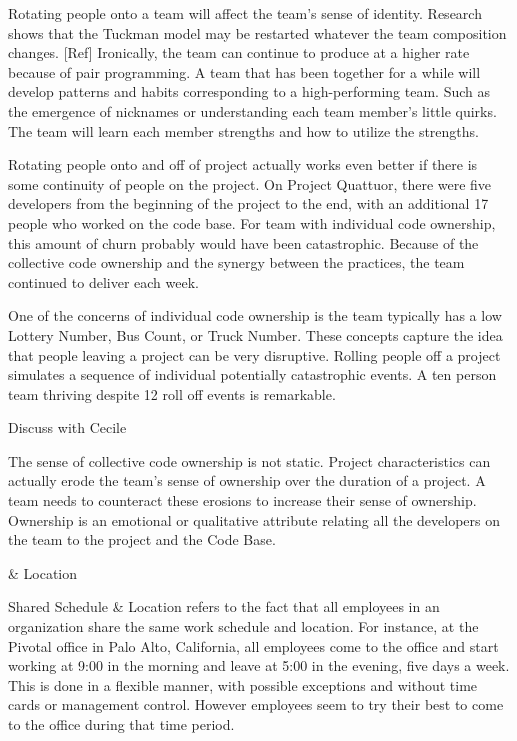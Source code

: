 \begin{table}[]
Rotating people onto a team will affect the team's sense of identity. Research shows that the Tuckman model may be restarted whatever the team composition changes. [Ref] Ironically, the team can continue to produce at a higher rate because of pair programming. A team that has been together for a while will develop patterns and habits corresponding to a high-performing team. Such as the emergence of nicknames or understanding each team member's little quirks. The team will learn each member strengths and how to utilize the strengths. 

Rotating people onto and off of project actually works even better if there is some continuity of people on the project. On Project Quattuor, there were five developers from the beginning of the project to the end, with an additional 17 people who worked on the code base. For team with individual code ownership, this amount of churn probably would have been catastrophic. Because of the collective code ownership and the synergy between the practices, the team continued to deliver each week.

One of the concerns of individual code ownership is the team typically has a low Lottery Number, Bus Count, or Truck Number. These concepts capture the idea that people leaving a project can be very disruptive. Rolling people off a project simulates a sequence of individual potentially catastrophic events. A ten person team thriving despite 12 roll off events is remarkable. 


Discuss with Cecile


The sense of collective code ownership is not static. Project characteristics can actually erode the team's sense of ownership over the duration of a project. A team needs to counteract these erosions to increase their sense of ownership. Ownership is an emotional or qualitative attribute relating all the developers on the team to the project and the Code Base.

 & Location

Shared Schedule & Location refers to the fact that all employees in an organization share the same work schedule and location. For instance, at the Pivotal office in Palo Alto, California, all employees come to the office and start working at 9:00 in the morning and leave at 5:00 in the evening, five days a week. This is done in a flexible manner, with possible exceptions and without time cards or management control. However employees seem to try their best to come to the office during that time period.


\end{table}
